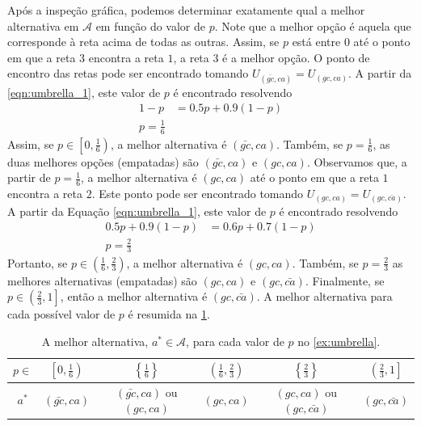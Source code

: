 { Após a inspeção gráfica, podemos determinar exatamente
 qual a melhor alternativa em $\mathcal{A}$ em
 função do valor de $p$.
 Note que a melhor opção é aquela que corresponde à
 reta acima de todas as outras.
 Assim, se $p$ está entre $0$ até o ponto em que a reta
 $3$ encontra a reta $1$, a reta $3$ é a melhor opção.
 O ponto de encontro das retas pode ser encontrado tomando
 $U_{(\bar{gc},ca)} = U_{(gc,ca)}$.
 A partir da \cref{eqn:umbrella_1},
 este valor de $p$ é encontrado resolvendo
 \begin{align*}
  1-p &= 0.5p + 0.9(1-p) \\
  p = \frac{1}{6}
 \end{align*}
 Assim, se $p \in \left[0,\frac{1}{6}\right)$, 
 a melhor alternativa é $(\bar{gc},ca)$.
 Também, se $p=\frac{1}{6}$, 
 as duas melhores opções (empatadas)
 são $(\bar{gc},ca)$ e $(gc,ca)$.
 Observamos que, a partir de $p=\frac{1}{6}$,
 a melhor alternativa é $(gc,ca)$ até o ponto
 em que a reta $1$ encontra a reta $2$.
 Este ponto pode ser encontrado tomando
 $U_{(gc,ca)} = U_{(gc,\bar{ca})}$.
 A partir da Equação \ref{eqn:umbrella_1},
 este valor de $p$ é encontrado resolvendo
 \begin{align*}
  0.5p + 0.9(1-p) &= 0.6p + 0.7(1-p) \\
  p = \frac{2}{3}
 \end{align*}
 Portanto, se
 $p \in \left(\frac{1}{6}, \frac{2}{3}\right)$,
 a melhor alternativa é $(gc, ca)$.
 Também, se $p=\frac{2}{3}$ as
 melhores alternativas (empatadas) são
 $(gc,ca)$ e $(gc,\bar{ca})$.
 Finalmente, se $p \in \left(\frac{2}{3},1\right]$,
 então a melhor alternativa é $(gc,\bar{ca})$.
 A melhor alternativa para cada possível valor de
 $p$ é resumida na \cref{table:umbrella}.
 \begin{table}
  \centering
  \begin{tabular}{|c|c|c|c|c|c|}
   \hline
   $p \in$
   & $\left[0,\frac{1}{6}\right)$
   & $\left\{\frac{1}{6}\right\}$
   & $\left(\frac{1}{6},\frac{2}{3}\right)$
   & $\left\{\frac{2}{3}\right\}$
   & $\left(\frac{2}{3},1\right]$ \\
   \hline
   $a^{*}$ & $(\bar{gc},ca)$
   & $(\bar{gc},ca)$ ou $(gc,ca)$
   & $(gc,ca)$
   & $(gc,ca)$ ou $(gc,\bar{ca})$
   & $(gc,\bar{ca})$ \\
   \hline
  \end{tabular}
  \caption{A melhor alternativa, $a^{*} \in \mathcal{A}$,
  para cada valor de $p$ no \cref{ex:umbrella}.}
  \label{table:umbrella}
 \end{table}
}{}

